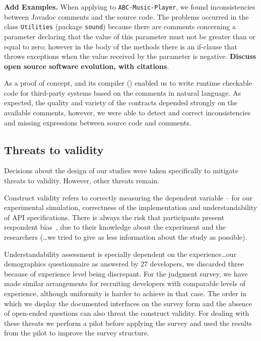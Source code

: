 \textbf{Add Examples. }
When applying \contractjdoc{} to \texttt{ABC-Music-Player}, we found inconsistencies between Javadoc comments and the source code. The problems occurred in the class \texttt{Utilities} (package
\texttt{sound}) because there are comments concerning a parameter declaring that the value of
this parameter must not be greater than or equal to zero; however in the body of the methods there
is an if-clause that throws exceptions when the value received by the parameter is negative.
\textbf{Discuss open source software evolution, with citations}.

As a proof of concept, \contractjdoc{} and its compiler (\contractjdocCompiler{}) enabled us to write runtime
checkable code for third-party systems based on the comments in natural
language.
As expected, the quality and variety of the contracts depended strongly on the available comments, however, we were able to
detect and correct inconsistencies and missing expressions between source code and comments.




\subsection{Threats to validity}
\label{sec:CaseStudyThreats}

Decisions about the design of our studies were taken specifically to mitigate threats to validity. However, other threats remain.

Construct validity refers to correctly measuring the
dependent variable -- for our experimental simulation, correctness of the implementation and understandability of API specifications.
There is always the risk that participants present respondent bias~\cite{},  due to their knowledge about the experiment and the researchers (…we tried to give as less information about the study as possible).

Understandability assessment is specially dependent on the experience…our demographics questionnaire as answered by 27 developers, we discarded three because of experience level being discrepant.
For the judgment survey, we have made similar arrangements for recruiting developers with comparable levels of experience, although uniformity is harder to achieve in that case.
The order in which we display the documented
interfaces on the survey form and the absence of open-ended questions can also threat the construct validity. For dealing with these threats we
perform a pilot before applying the survey and used the results from the pilot to improve the survey structure. 


